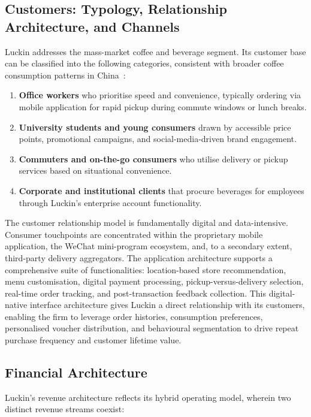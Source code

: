 \documentclass[12pt,a4paper]{article}
\begin{document}
\subsection{Customers: Typology, Relationship Architecture, and Channels}

Luckin addresses the mass-market coffee and beverage segment. Its customer base can be classified into the following categories, consistent with broader coffee consumption patterns in China~\cite{iimedia2025}:

\begin{enumerate}[leftmargin=*,label=(\roman*)]
  \item \textbf{Office workers} who prioritise speed and convenience, typically ordering via mobile application for rapid pickup during commute windows or lunch breaks.
  \item \textbf{University students and young consumers} drawn by accessible price points, promotional campaigns, and social-media-driven brand engagement.
  \item \textbf{Commuters and on-the-go consumers} who utilise delivery or pickup services based on situational convenience.
  \item \textbf{Corporate and institutional clients} that procure beverages for employees through Luckin's enterprise account functionality.
\end{enumerate}

The customer relationship model is fundamentally digital and data-intensive. Consumer touchpoints are concentrated within the proprietary mobile application, the WeChat mini-program ecosystem, and, to a secondary extent, third-party delivery aggregators. The application architecture supports a comprehensive suite of functionalities: location-based store recommendation, menu customisation, digital payment processing, pickup-versus-delivery selection, real-time order tracking, and post-transaction feedback collection. This digital-native interface architecture gives Luckin a direct relationship with its customers, enabling the firm to leverage order histories, consumption preferences, personalised voucher distribution, and behavioural segmentation to drive repeat purchase frequency and customer lifetime value.

\subsection{Financial Architecture}

Luckin's revenue architecture reflects its hybrid operating model, wherein two distinct revenue streams coexist:
\end{document}
